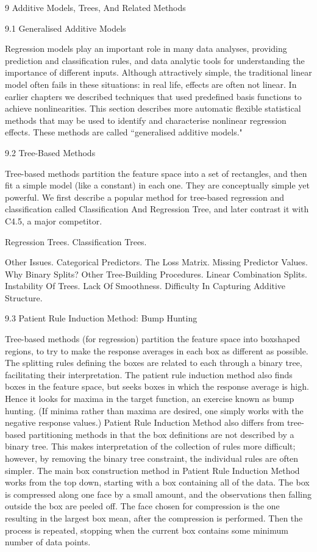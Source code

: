 9 Additive Models, Trees, And Related Methods

9.1 Generalised Additive Models

Regression models play an important role in many data analyses, providing prediction and classification rules, and data analytic tools for understanding the importance of different inputs. Although attractively simple, the traditional linear model often fails in these situations: in real life, effects are often not linear. In earlier chapters we described techniques that used predefined basis functions to achieve nonlinearities. This section describes more automatic flexible statistical methods that may be used to identify and characterise nonlinear regression effects. These methods are called ``generalised additive models."

9.2 Tree-Based Methods

Tree-based methods partition the feature space into a set of rectangles, and then fit a simple model (like a constant) in each one. They are conceptually simple yet powerful. We first describe a popular method for tree-based regression and classification called Classification And Regression Tree, and later contrast it with C4.5, a major competitor.

Regression Trees. Classification Trees.

Other Issues. Categorical Predictors. The Loss Matrix. Missing Predictor Values. Why Binary Splits? Other Tree-Building Procedures. Linear Combination Splits. Instability Of Trees. Lack Of Smoothness. Difficulty In Capturing Additive Structure.

9.3 Patient Rule Induction Method: Bump Hunting

Tree-based methods (for regression) partition the feature space into boxshaped regions, to try to make the response averages in each box as different as possible. The splitting rules defining the boxes are related to each through a binary tree, facilitating their interpretation. The patient rule induction method also finds boxes in the feature space, but seeks boxes in which the response average is high. Hence it looks for maxima in the target function, an exercise known as bump hunting. (If minima rather than maxima are desired, one simply works with the negative response values.) Patient Rule Induction Method also differs from tree-based partitioning methods in that the box definitions are not described by a binary tree. This makes interpretation of the collection of rules more difficult; however, by removing the binary tree constraint, the individual rules are often simpler. The main box construction method in Patient Rule Induction Method works from the top down, starting with a box containing all of the data. The box is compressed along one face by a small amount, and the observations then falling outside the box are peeled off. The face chosen for compression is the one resulting in the largest box mean, after the compression is performed. Then the process is repeated, stopping when the current box contains some minimum number of data points.

